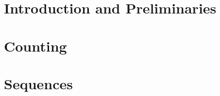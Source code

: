 \documentclass[12pt, oneside]{book}
\begin{document}



\chapter[Introduction]{Introduction and Preliminaries}

	
	
	
	
	
	

\chapter[Counting]{Counting}

	
	
	
	
	
	
	
	
	
	
	
	
	
	
	
	
	
	
	
	
	
	
	
	

\chapter[Sequences]{Sequences}

	
	
		
	
	
		
	
	
		
	
	
		
	
	
	
\end{document}
